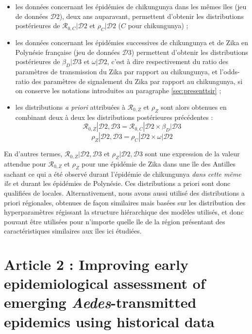 \begin{itemize}
\item les données concernant les épidémies de chikungunya dans les mêmes îles (jeu de données $\mathcal{D}2$), deux ans auparavant, permettent d'obtenir les distributions postérieures de $\mathcal{R}_{0,C}|\mathcal{D}2$ et $\rho_C|\mathcal{D}2$ ($C$ pour chikungunya) ;
\item les données concernant les épidémies successives de chikungunya et de Zika en Polynésie française (jeu de données $\mathcal{D}3$) permettent d'obtenir les distributions postérieures de $\beta_D|\mathcal{D}3$ et $\omega|\mathcal{D}2$, c'est à dire respectivement du ratio des paramètres de transmission du Zika par rapport au chikungunya, et l'odds-ratio des paramètres de signalement du Zika par rapport au chikungunya, si on conserve les notations introduites au paragraphe \ref{sec:presenttsir} ;
\item les distributions {\em a priori} attribuées à  $\mathcal{R}_{0,Z}$ et $\rho_Z$ sont alors obtenues en combinant deux à deux les distributions postérieures précédentes :
\begin{equation}
\mathcal{R}_{0,Z}|\mathcal{D}2,\mathcal{D}3 = \mathcal{R}_{0,C}|\mathcal{D}2 \times \beta_D|\mathcal{D}3
\end{equation}
\begin{equation}
\rho_Z|\mathcal{D}2,\mathcal{D}3 = \rho_C|\mathcal{D}2 \times \omega|\mathcal{D}2
\end{equation}
\end{itemize}

En d'autres termes, $\mathcal{R}_{0,Z}|\mathcal{D}2,\mathcal{D}3$ et $\rho_Z|\mathcal{D}2,\mathcal{D}3$ sont une expression de la valeur attendue pour $\mathcal{R}_{0,Z}$ et $\rho_Z$ pour une épidémie de Zika dans une île des Antilles sachant ce qui a été observé durant l'épidémie de chikungunya {\em dans cette même île} et durant les épidémies de Polynésie.
Ces distributions a priori sont donc qualifiées de \guillemotleft locales\guillemotright.
Alternativement, nous avons aussi utilisé des distributions a priori \guillemotleft régionales\guillemotright, obtenues de façon similaires mais basées sur les distribution des hyperparamètres régissant la structure hiérarchique des modèles utilisés, et donc pouvant être utilisées pour n'importe quelle île de la région présentant des caractéristiques similaires aux îles ici étudiées.



\section[Article 2]{Article 2 : \guillemotleft Improving early epidemiological assessment of emerging {\em Aedes}-transmitted epidemics using historical data\guillemotright}
\cleardoublepage

\cleardoublepage
%

